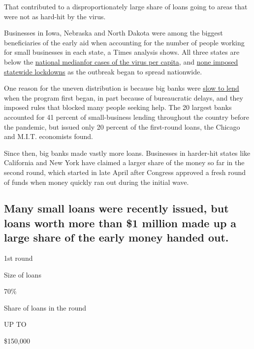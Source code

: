 That contributed to a disproportionately large share of loans going to
areas that were not as hard-hit by the virus.

Businesses in Iowa, Nebraska and North Dakota were among the biggest
beneficiaries of the early aid when accounting for the number of people
working for small businesses in each state, a Times analysis shows. All
three states are below the
\href{https://www.nytimes.com/interactive/2020/us/coronavirus-us-cases.html}{national
median}\href{https://www.nytimes.com/interactive/2020/us/coronavirus-us-cases.html}{for
cases of the virus per capita}, and
\href{https://www.nytimes.com/interactive/2020/us/states-reopen-map-coronavirus.html}{none
imposed statewide lockdowns} as the outbreak began to spread nationwide.

One reason for the uneven distribution is because big banks were
\href{https://www.nytimes.com/2020/04/02/business/small-business-coronavirus-stimulus.html}{slow
to lend} when the program first began, in part because of bureaucratic
delays, and they imposed rules that blocked many people seeking help.
The 20 largest banks accounted for 41 percent of small-business lending
throughout the country before the pandemic, but issued only 20 percent
of the first-round loans, the Chicago and M.I.T. economists found.

Since then, big banks made vastly more loans. Businesses in harder-hit
states like California and New York have claimed a larger share of the
money so far in the second round, which started in late April after
Congress approved a fresh round of funds when money quickly ran out
during the initial wave.

\hypertarget{many-small-loans-were-recently-issued-but-loans-worth-more-than-1-million-made-up-a-large-share-of-the-early-money-handed-out}{%
\subsection{Many small loans were recently issued, but loans worth more
than \$1 million made up a large share of the early money handed
out.}\label{many-small-loans-were-recently-issued-but-loans-worth-more-than-1-million-made-up-a-large-share-of-the-early-money-handed-out}}

1st round

Size of loans

70\%

Share of loans in the round

UP TO

\$150,000

